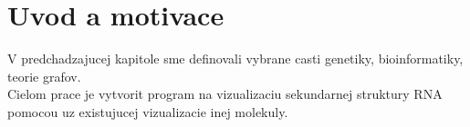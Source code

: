 
\chapter{Uvod a motivace}

V predchadzajucej kapitole sme definovali vybrane casti genetiky, bioinformatiky,
teorie grafov.
\\
Cielom prace je vytvorit program na vizualizaciu sekundarnej struktury RNA
pomocou uz existujucej vizualizacie inej molekuly.



